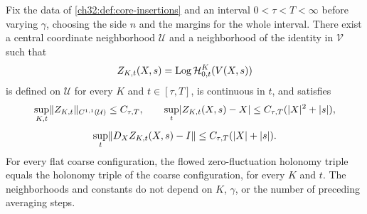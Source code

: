 \begin{lemma}\label{ch32:lem:uniform-time-central-jet}
Fix the data of \cref{ch32:def:core-insertions} and an interval $0<\tau<T<\infty$ before varying $\gamma$, choosing the side $n$ and the margins for the whole interval. There exist a central coordinate neighborhood $\mathcal U$ and a neighborhood of the identity in $\mathcal V$ such that
\[
 Z_{K,t}(X,s)=\operatorname{Log}\mathcal H^K_{0,t}(V(X,s))
\]
is defined on $\mathcal U$ for every $K$ and $t\in[\tau,T]$, is continuous in $t$, and satisfies
\[
 \sup_{K,t}\lVert Z_{K,t}\rVert_{C^{1,1}(\mathcal U)}\le C_{\tau,T},\qquad
 \sup_t\lvert Z_{K,t}(X,s)-X\rvert\le C_{\tau,T}(\lvert X\rvert^2+\lvert s\rvert),
\]
\[
 \sup_t\lVert D_XZ_{K,t}(X,s)-I\rVert\le C_{\tau,T}(\lvert X\rvert+\lvert s\rvert).
\]
For every flat coarse configuration, the flowed zero-fluctuation holonomy triple equals the holonomy triple of the coarse configuration, for every $K$ and $t$. The neighborhoods and constants do not depend on $K$, $\gamma$, or the number of preceding averaging steps.
\end{lemma}

